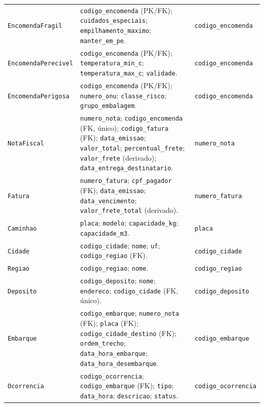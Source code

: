 {\begin{longtable}{@{}L{3.5cm}L{9.4cm}L{1.9cm}@{}}
\texttt{Encomenda\allowbreak Fragil} &
\texttt{codigo\_encomenda} (PK/FK); \texttt{cuidados\_especiais}; \texttt{empilhamento\_maximo}; \texttt{manter\_em\_pe}. &
\texttt{codigo\_encomenda}\\

\texttt{Encomenda\allowbreak Perecivel} &
\texttt{codigo\_encomenda} (PK/FK); \texttt{temperatura\_min\_c}; \texttt{temperatura\_max\_c}; \texttt{validade}. &
\texttt{codigo\_encomenda}\\

\texttt{Encomenda\allowbreak Perigosa} &
\texttt{codigo\_encomenda} (PK/FK); \texttt{numero\_onu}; \texttt{classe\_risco}; \texttt{grupo\_embalagem}. &
\texttt{codigo\_encomenda}\\

\texttt{NotaFiscal} &
\texttt{numero\_nota}; \texttt{codigo\_encomenda} (FK, único); \texttt{codigo\_fatura} (FK); \texttt{data\_emissao}; \texttt{valor\_total}; \texttt{percentual\_frete}; \texttt{valor\_frete} (derivado); \texttt{data\_entrega\_destinatario}. &
\texttt{numero\_nota}\\

\texttt{Fatura} &
\texttt{numero\_fatura}; \texttt{cpf\_pagador} (FK); \texttt{data\_emissao}; \texttt{data\_vencimento}; \texttt{valor\_frete\_total} (derivado). &
\texttt{numero\_fatura}\\

\texttt{Caminhao} &
\texttt{placa}; \texttt{modelo}; \texttt{capacidade\_kg}; \texttt{capacidade\_m3}. &
\texttt{placa}\\

\texttt{Cidade} &
\texttt{codigo\_cidade}; \texttt{nome}; \texttt{uf}; \texttt{codigo\_regiao} (FK). &
\texttt{codigo\_cidade}\\

\texttt{Regiao} &
\texttt{codigo\_regiao}; \texttt{nome}. &
\texttt{codigo\_regiao}\\

\texttt{Deposito} &
\texttt{codigo\_deposito}; \texttt{nome}; \texttt{endereco}; \texttt{codigo\_cidade} (FK, único). &
\texttt{codigo\_deposito}\\

\texttt{Embarque} &
\texttt{codigo\_embarque}; \texttt{numero\_nota} (FK); \texttt{placa} (FK); \texttt{codigo\_cidade\_destino} (FK); \texttt{ordem\_trecho}; \texttt{data\_hora\_embarque}; \texttt{data\_hora\_desembarque}. &
\texttt{codigo\_embarque}\\

\texttt{Ocorrencia} &
\texttt{codigo\_ocorrencia}; \texttt{codigo\_embarque} (FK); \texttt{tipo}; \texttt{data\_hora}; \texttt{descricao}; \texttt{status}. &
\texttt{codigo\_ocorrencia}\\
\end{longtable}
}

